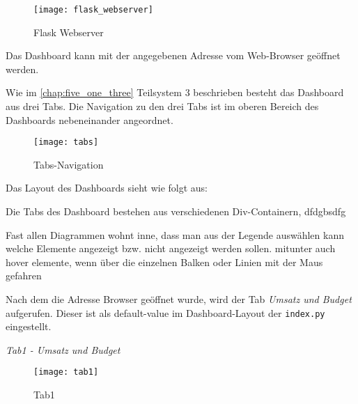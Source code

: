     \begin{figure}[H]
        \centering
            \texttt{[image: flask\_webserver]}
            \caption{Flask Webserver}
            \label{fig:flask}
    \end{figure}

    Das Dashboard kann mit der angegebenen Adresse vom Web-Browser geöffnet werden.

    Wie im \autoref{chap:five_one_three} Teilsystem 3 beschrieben besteht das Dashboard aus drei Tabs.
    Die Navigation zu den drei Tabs ist im oberen Bereich des Dashboards nebeneinander angeordnet. 
    
    \begin{figure}[H]
        \centering
            \texttt{[image: tabs]}
            \caption{Tabs-Navigation}
            \label{fig:flask}
    \end{figure}

  
    
    Das Layout des Dashboards sieht wie folgt aus:


    Die Tabs des Dashboard bestehen aus verschiedenen Div-Containern, dfdgbsdfg
    
    
    Fast allen Diagrammen wohnt inne, dass man aus der Legende auswählen kann welche Elemente angezeigt bzw. nicht angezeigt werden sollen.
    mitunter auch hover elemente, wenn über die einzelnen Balken oder Linien mit der Maus gefahren 
    

    Nach dem die Adresse Browser geöffnet wurde, wird der Tab \textit{Umsatz und Budget} aufgerufen. Dieser ist
    als default-value im Dashboard-Layout der \texttt{index.py} eingestellt.


    \textit{Tab1 - Umsatz und Budget}
    \begin{figure}[H]
        \centering
            \texttt{[image: tab1]}
            \caption{Tab1}
            \label{fig:tab1}
    \end{figure}


